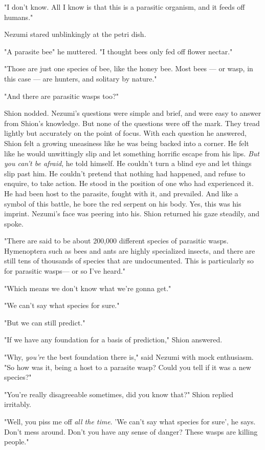"I don't know. All I know is that this is a parasitic organism, and it
feeds off humans."

Nezumi stared unblinkingly at the petri dish.

"A parasite bee\el " he muttered. "I thought bees only fed off flower
nectar."

"Those are just one species of bee, like the honey bee. Most bees --- or
wasp, in this case --- are hunters, and solitary by nature."

"And there are parasitic wasps too?"

Shion nodded. Nezumi's questions were simple and brief, and were easy to
answer from Shion's knowledge. But none of the questions were off the
mark. They tread lightly but accurately on the point of focus. With each
question he answered, Shion felt a growing uneasiness like he was being
backed into a corner. He felt like he would unwittingly slip and let
something horrific escape from his lips. \emph{But you can't be afraid}, he
told himself. He couldn't turn a blind eye and let things slip past him.
He couldn't pretend that nothing had happened, and refuse to enquire, to
take action. He stood in the position of one who had experienced it. He
had been host to the parasite, fought with it, and prevailed. And like a
symbol of this battle, he bore the red serpent on his body. Yes, this
was his imprint. Nezumi's face was peering into his. Shion returned his
gaze steadily, and spoke.

"There are said to be about 200,000 different species of parasitic
wasps. Hymenoptera such as bees and ants are highly specialized insects,
and there are still tens of thousands of species that are undocumented.
This is particularly so for parasitic wasps--- or so I've heard."

"Which means we don't know what we're gonna get."

"We can't say what species for sure."

"But we can still predict."

"If we have any foundation for a basis of prediction," Shion answered.

"Why, \emph{you're} the best foundation there is," said Nezumi with mock
enthusiasm. "So how was it, being a host to a parasite wasp? Could you
tell if it was a new species?"

"You're really disagreeable sometimes, did you know that?" Shion replied
irritably.

"Well, you piss me off \emph{all the time}. 'We can't say what species for
sure', he says. Don't mess around. Don't you have any sense of danger?
These wasps are killing people."

